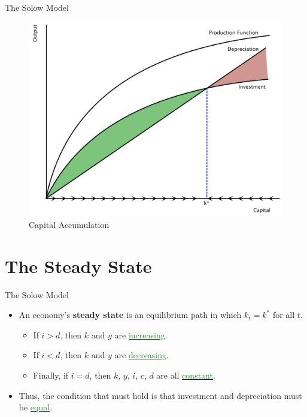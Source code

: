 \documentclass[xcolor={dvipsnames},pdf, hyperref={colorlinks=true, citecolor=ForestGreen, linkcolor=BlueViolet, urlcolor=Magenta}]{beamer}
\theoremstyle{definition}
\newcommand{\dd}[1]{{\underline{\textcolor{ForestGreen}{#1}}}}
\begin{document}
\begin{frame}{The Solow Model}
\begin{figure}[H]
	\centering
	\includegraphics[scale=.35]{plot84.pdf}
	\caption{Capital Accumulation}
\end{figure}
\end{frame}

\section{The Steady State}

\begin{frame}{The Solow Model}
\begin{itemize}
	\item An economy's \textbf{steady state} is an equilibrium path in which $k_t = k^{*}$ for all $t$. 
	\begin{itemize}
	\item If $i>d$, then $k$ and $y$ are \dd{increasing}. 
	\item If $i<d$, then $k$ and $y$ are \dd{decreasing}. 
	\item Finally, if $i = d$, then $k$, $y$, $i$, $c$, $d$ are all \dd{constant}.
\end{itemize}
	\item Thus, the condition that must hold is that investment and depreciation must be \dd{equal}.
\end{itemize}
\end{frame}
\end{document}
